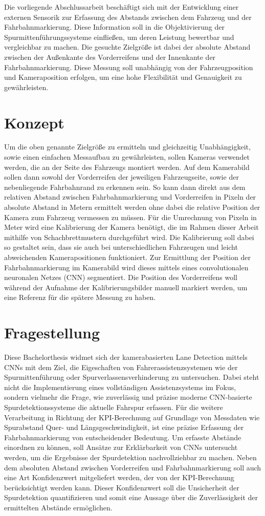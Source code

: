 Die vorliegende Abschlussarbeit beschäftigt sich mit der Entwicklung einer externen Sensorik zur Erfassung des Abstands zwischen dem Fahrzeug und der Fahrbahnmarkierung. Diese Information soll in die Objektivierung der Spurmittenführungssysteme einfließen, um deren Leistung bewertbar und vergleichbar zu machen. Die gesuchte Zielgröße ist dabei der absolute Abstand zwischen der Außenkante des Vorderreifens und der Innenkante der Fahrbahnmarkierung. Diese Messung soll unabhängig von der Fahrzeugposition und Kameraposition erfolgen, um eine hohe Flexibilität und Genauigkeit zu gewährleisten.

\section{Konzept}
Um die oben genannte Zielgröße zu ermitteln und gleichzeitig Unabhängigkeit, sowie einen einfachen Messaufbau zu gewährleisten, sollen Kameras verwendet werden, die an der Seite des Fahrzeugs montiert werden. Auf dem Kamerabild sollen dann sowohl der Vorderreifen der jeweiligen Fahrzeugseite, sowie der nebenliegende Fahrbahnrand zu erkennen sein.
So kann dann direkt aus dem relativen Abstand zwischen Fahrbahnmarkierung und Vorderreifen in Pixeln der absolute Abstand in Metern ermittelt werden ohne dabei die relative Position der Kamera zum Fahrzeug vermessen zu müssen.
Für die Umrechnung von Pixeln in Meter wird eine Kalibrierung der Kamera benötigt, die im Rahmen dieser Arbeit mithilfe von Schachbrettmustern durchgeführt wird. Die Kalibrierung soll dabei so gestaltet sein, dass sie auch bei unterschiedlichen Fahrzeugen und leicht abweichenden Kamerapositionen funktioniert.
Zur Ermittlung der Position der Fahrbahnmarkierung im Kamerabild wird dieses mittels eines convolutionalen neuronalen Netzes (CNN) segmentiert. Die Position des Vorderreifens woll während der Aufnahme der Kalibrierungsbilder manuell markiert werden, um eine Referenz für die spätere Messung zu haben. 

\section{Fragestellung}
Diese Bachelorthesis widmet sich der kamerabasierten Lane Detection mittels CNNs mit dem Ziel, die Eigeschaften von Fahrerassistenzsystemen wie der Spurmittenführung oder Spurverlassensverhinderung zu untersuchen. Dabei steht nicht die Implementierung eines vollständigen Assistenzsystems im Fokus, sondern vielmehr die Frage, wie zuverlässig und präzise moderne CNN-basierte Spurdetektionssysteme die aktuelle Fahrspur erfassen. Für die weitere Verarbeitung in Richtung der KPI-Berechnung auf Grundlage von Messdaten wie Spurabstand Quer- und Längsgeschwindigkeit, ist eine präzise Erfassung der Fahrbahnmarkierung von entscheidender Bedeutung. Um erfasste Abstände einordnen zu können, soll Ansätze zur Erklärbarkeit von CNNs untersucht werden, um die Ergebnisse der Spurdetektion nachvollziehbar zu machen. Neben dem absoluten Abstand zwischen Vorderreifen und Fahrbahnmarkierung soll auch eine Art Konfidenzwert mitgeliefert werden, der von der KPI-Berechnung berücksichtigt werden kann. Dieser Konfidenzwert soll die Unsicherheit der Spurdetektion quantifizieren und somit eine Aussage über die Zuverlässigkeit der ermittelten Abstände ermöglichen.